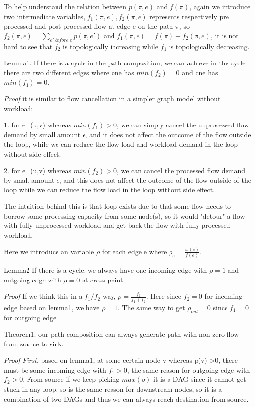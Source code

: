 \documentclass[twocolumn]{article}
\begin{document}
To help understand the relation between $p(\pi, e)$ and $f(\pi)$, again we introduce two intermediate variables, $f_1(\pi, e), f_2(\pi, e) $ represents respectively pre processed and post processed flow at edge e on the path $\pi$, so $f_2(\pi, e) =\sum\limits_{e'\; before\;e}p(\pi, e') $ and $ f_1(\pi, e)=f(\pi)- f_2(\pi, e)$, it is not hard to see that $f_2$ is topologically increasing while $f_1$ is topologically decreasing.

Lemma1: If there is a cycle in the path composition, we can achieve in the cycle there are two different edges where one has $min(f_2) = 0$ and one has $min(f_1)=0$. 

\textit{Proof} it is similar to flow cancellation in a simpler graph model without workload: 

1. for e=(u,v) whereas $min(f_1) >0$, we can simply cancel the unprocessed flow demand by small amount $\epsilon$, and it does not affect the outcome of the flow outside the loop, while we can reduce the flow load and workload demand in the loop without side effect. 

2. for e=(u,v) whereas $min(f_2)>0$, we can cancel the processed flow demand by small amount $\epsilon$, and this does not affect the outcome of the flow outside of the loop while we can reduce the flow load in the loop without side effect. 


The intuition behind this is that loop exists due to that some flow needs to borrow some processing capacity from some node(s), so it would "detour" a flow with fully unprocessed workload and get back the flow with fully processed workload. 

Here we introduce an variable $\rho$ for each edge e where $\rho_{e} = \frac{ w(e)}{f(e)}$.

Lemma2
If there is a cycle, we always have one incoming edge with $\rho =1$ and outgoing edge with $\rho =0$ at cross point.

\textit{Proof}
If we think this in a $f_1/f_2$ way, $\rho = \frac{ f_1} {f_1+f_2 }$. Here since $f_2=0$ for incoming edge based on lemma1, we have $\rho=1$. The same way to get $\rho_{out}=0$ since $f_1=0$ for outgoing edge. 


Theorem1: our path composition can always generate path with non-zero flow from source to sink. 

\textit{Proof}
\textit{First}, based on lemma1, at some certain node v whereas p(v) >0, there must be some incoming edge with $f_1>0$, the same reason for outgoing edge with $f_2>0$. From source if we keep picking $max(\rho)$ it is a DAG since it cannot get stuck in any loop, so is the same reason for downstream nodes, so it is a combination of two DAGs and thus we can always reach destination from source. 
 
\end{document}
